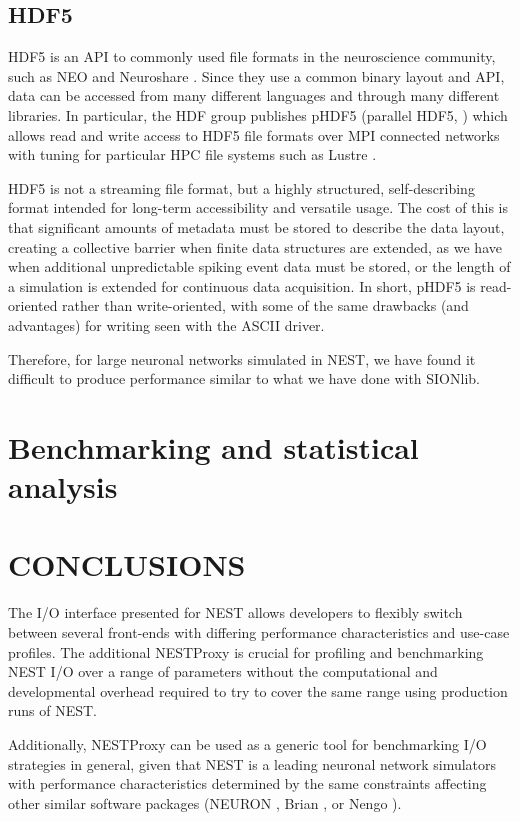 \documentclass[]{YIC2015}
\begin{document}
\subsection{HDF5}
\label{sec:hdf5}
HDF5 is an API to commonly used file formats in the neuroscience
community, such as NEO \cite{neo} and Neuroshare \cite{neuroshare}.
Since they use a common binary layout and API, data can be accessed
from many different languages and through many different libraries. In
particular, the HDF group publishes pHDF5 (parallel HDF5, \cite{hdf5})
which allows read and write access to HDF5 file formats over MPI
connected networks with tuning for particular HPC file systems such as
Lustre \cite{lustre}.

HDF5 is not a streaming file format, but a highly structured,
self-describing format intended for long-term accessibility and
versatile usage. The cost of this is that significant amounts of
metadata must be stored to describe the data layout, creating a
collective barrier when finite data structures are extended, as we
have when additional unpredictable spiking event data must be stored,
or the length of a simulation is extended for continuous data
acquisition. In short, pHDF5 is read-oriented rather than
write-oriented, with some of the same drawbacks (and advantages) for
writing seen with the ASCII driver.

Therefore, for large neuronal networks simulated in NEST, we have
found it difficult to produce performance similar to what we have done
with SIONlib.

\section{Benchmarking and statistical analysis}


\section{CONCLUSIONS}

The I/O interface presented for NEST allows developers to flexibly
switch between several front-ends with differing performance
characteristics and use-case profiles. The additional NESTProxy is
crucial for profiling and benchmarking NEST I/O over a range of
parameters without the computational and developmental overhead
required to try to cover the same range using production runs of
NEST.

Additionally, NESTProxy can be used as a generic tool for benchmarking
I/O strategies in general, given that NEST is a leading neuronal
network simulators with performance characteristics determined by the
same constraints affecting other similar software packages (NEURON
\cite{neuron}, Brian \cite{brian}, or Nengo \cite{nengo}).
\end{document}

